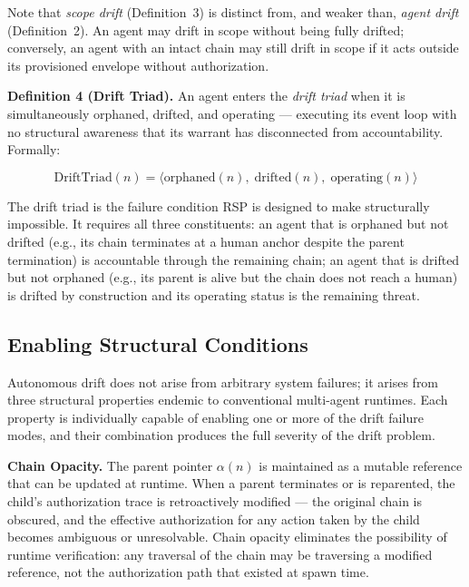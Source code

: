 Note that \emph{scope drift} (Definition~3) is distinct from, and weaker than, \emph{agent drift} (Definition~2). An agent may drift in scope without being fully drifted; conversely, an agent with an intact chain may still drift in scope if it acts outside its provisioned envelope without authorization.

\medskip
\noindent\textbf{Definition 4 (Drift Triad).} An agent enters the \emph{drift triad} when it is simultaneously orphaned, drifted, and operating — executing its event loop with no structural awareness that its warrant has disconnected from accountability. Formally:

\begin{equation}
\text{DriftTriad}(n) = \bigl\langle \text{orphaned}(n),\; \text{drifted}(n),\; \text{operating}(n) \bigr\rangle
\label{eq:drift-triad}
\end{equation}

The drift triad is the failure condition RSP is designed to make structurally impossible. It requires all three constituents: an agent that is orphaned but not drifted (e.g., its chain terminates at a human anchor despite the parent termination) is accountable through the remaining chain; an agent that is drifted but not orphaned (e.g., its parent is alive but the chain does not reach a human) is drifted by construction and its operating status is the remaining threat.

\subsection{Enabling Structural Conditions}

Autonomous drift does not arise from arbitrary system failures; it arises from three structural properties endemic to conventional multi-agent runtimes. Each property is individually capable of enabling one or more of the drift failure modes, and their combination produces the full severity of the drift problem.

\medskip
\noindent\textbf{Chain Opacity.} The parent pointer $\alpha(n)$ is maintained as a mutable reference that can be updated at runtime. When a parent terminates or is reparented, the child's authorization trace is retroactively modified — the original chain is obscured, and the effective authorization for any action taken by the child becomes ambiguous or unresolvable. Chain opacity eliminates the possibility of runtime verification: any traversal of the chain may be traversing a modified reference, not the authorization path that existed at spawn time.

